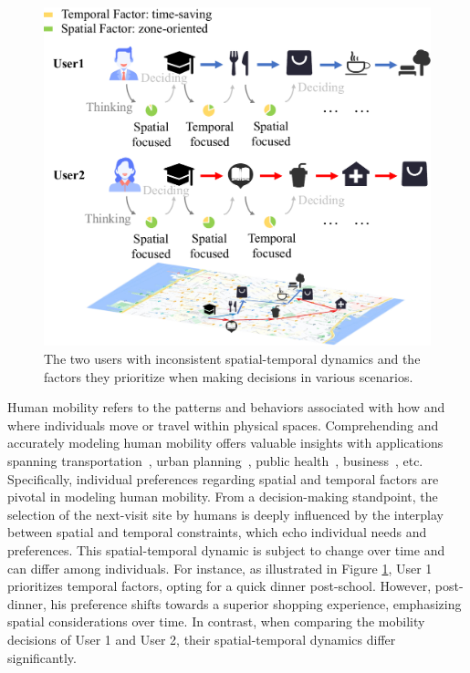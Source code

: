 \documentclass[letterpaper]{article} %
\begin{document}
\begin{figure}[t]
\centering
\includegraphics[width=\linewidth]{introduction.pdf} 
\caption{The two users with inconsistent spatial-temporal dynamics and the factors they prioritize when making decisions in various scenarios.}
\label{fig1}
\end{figure}

Human mobility refers to the patterns and behaviors associated with how and where individuals move or travel within physical spaces. 
Comprehending and accurately modeling human mobility offers valuable insights with applications spanning transportation~\cite{wang2020incremental}, urban planning~\cite{wang2018learning,wang2020reimagining}, public health~\cite{qureshi2021equitable}, business~\cite{antoniou2012human}, etc.
Specifically, individual preferences regarding spatial and temporal factors are pivotal in modeling human mobility. 
From a decision-making standpoint, the selection of the next-visit site by humans is deeply influenced by the interplay between spatial and temporal constraints, which echo individual needs and preferences. 
This spatial-temporal dynamic is subject to change over time and can differ among individuals. 
For instance, as illustrated in Figure \ref{fig1}, User 1 prioritizes temporal factors, opting for a quick dinner post-school. 
However, post-dinner, his preference shifts towards a superior shopping experience, emphasizing spatial considerations over time. 
In contrast, when comparing the mobility decisions of User 1 and User 2, their spatial-temporal dynamics differ significantly.
\end{document}
